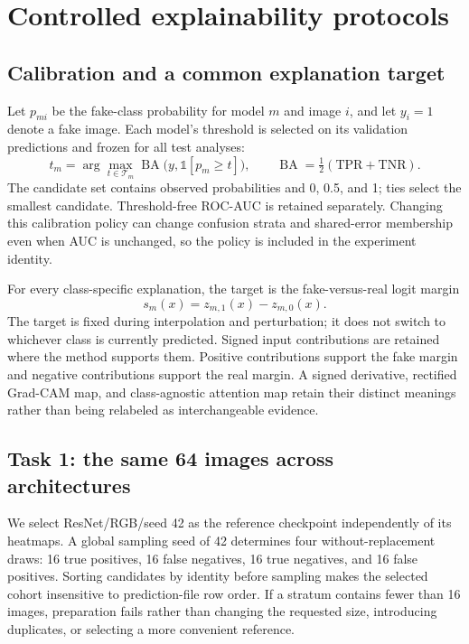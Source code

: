 \documentclass{article}
\newcommand{\BA}{\operatorname{BA}}
\newcommand{\ind}{\mathbb{1}}
\begin{document}
\section{Controlled explainability protocols}
\subsection{Calibration and a common explanation target}
Let $p_{mi}$ be the fake-class probability for model $m$ and image $i$, and let $y_i=1$ denote a fake image. Each model's threshold is selected on its validation predictions and frozen for all test analyses:
\begin{equation}
 t_m=\arg\max_{t\in\mathcal T_m}\BA\bigl(y,\ind[p_m\geq t]\bigr),\qquad
 \BA=\tfrac12(\mathrm{TPR}+\mathrm{TNR}).
\end{equation}
The candidate set contains observed probabilities and 0, 0.5, and 1; ties select the smallest candidate. Threshold-free ROC-AUC is retained separately. Changing this calibration policy can change confusion strata and shared-error membership even when AUC is unchanged, so the policy is included in the experiment identity.

For every class-specific explanation, the target is the fake-versus-real logit margin
\begin{equation}
 s_m(x)=z_{m,1}(x)-z_{m,0}(x).
\end{equation}
The target is fixed during interpolation and perturbation; it does not switch to whichever class is currently predicted. Signed input contributions are retained where the method supports them. Positive contributions support the fake margin and negative contributions support the real margin. A signed derivative, rectified Grad-CAM map, and class-agnostic attention map retain their distinct meanings rather than being relabeled as interchangeable evidence.

\subsection{Task 1: the same 64 images across architectures}
We select ResNet/RGB/seed 42 as the reference checkpoint independently of its heatmaps. A global sampling seed of 42 determines four without-replacement draws: 16 true positives, 16 false negatives, 16 true negatives, and 16 false positives. Sorting candidates by identity before sampling makes the selected cohort insensitive to prediction-file row order. If a stratum contains fewer than 16 images, preparation fails rather than changing the requested size, introducing duplicates, or selecting a more convenient reference.
\end{document}
